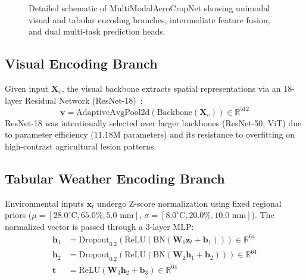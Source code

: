 \documentclass[conference]{IEEEtran}
\begin{document}
\begin{figure}[t]
\caption{Detailed schematic of MultiModalAeroCropNet showing unimodal visual and tabular encoding branches, intermediate feature fusion, and dual multi-task prediction heads.}
\label{fig:neural_architecture}
\end{figure}

\subsection{Visual Encoding Branch}
Given input $\mathbf{X}_v$, the visual backbone extracts spatial representations via an 18-layer Residual Network (ResNet-18)~\cite{ferentinos2018}:
\begin{equation}
    \mathbf{v} = \text{AdaptiveAvgPool2d}(\text{Backbone}(\mathbf{X}_v)) \in \mathbb{R}^{512}
\end{equation}
ResNet-18 was intentionally selected over larger backbones (ResNet-50, ViT) due to parameter efficiency ($11.18\text{M}$ parameters) and its resistance to overfitting on high-contrast agricultural lesion patterns.

\subsection{Tabular Weather Encoding Branch}
Environmental inputs $\mathbf{x}_t$ undergo Z-score normalization using fixed regional priors ($\mu = [28.0^\circ\text{C}, 65.0\%, 5.0\text{ mm}]$, $\sigma = [8.0^\circ\text{C}, 20.0\%, 10.0\text{ mm}]$). The normalized vector is passed through a 3-layer MLP:
\begin{align}
    \mathbf{h}_1 &= \text{Dropout}_{0.2}(\text{ReLU}(\text{BN}(\mathbf{W}_1 \mathbf{z}_t + \mathbf{b}_1))) \in \mathbb{R}^{64} \\
    \mathbf{h}_2 &= \text{Dropout}_{0.2}(\text{ReLU}(\text{BN}(\mathbf{W}_2 \mathbf{h}_1 + \mathbf{b}_2))) \in \mathbb{R}^{64} \\
    \mathbf{t} &= \text{ReLU}(\mathbf{W}_3 \mathbf{h}_2 + \mathbf{b}_3) \in \mathbb{R}^{64}
\end{align}
\end{document}
